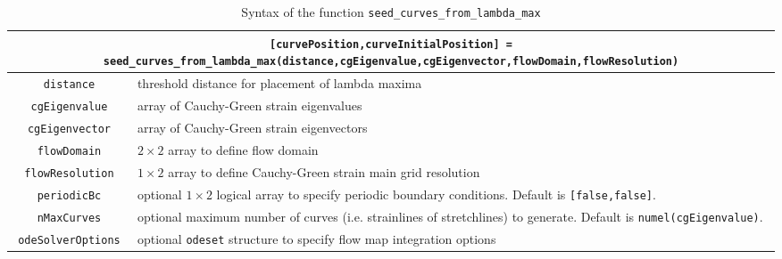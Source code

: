 \documentclass{article}
\begin{document}
\begin{table}
\begin{center}
\begin{tabular}{|c|p{}|}
\hline \hline
\multicolumn{2}{|p{\textwidth}|}{\lstinline![curvePosition,curveInitialPosition] = seed_curves_from_lambda_max(distance,cgEigenvalue,cgEigenvector,flowDomain,flowResolution)!}\\
\hline
\lstinline!distance! & threshold distance for placement of lambda maxima\\
\hline
\lstinline!cgEigenvalue! & array of Cauchy-Green strain eigenvalues\\
\hline
\lstinline!cgEigenvector! & array of Cauchy-Green strain eigenvectors\\
\hline
\lstinline!flowDomain! & $2 \times 2$ array to define flow domain\\
\hline
\lstinline!flowResolution! & $1 \times 2$ array to define Cauchy-Green strain main grid resolution\\
\hline
\lstinline!periodicBc! & optional $1 \times 2$ logical array to specify periodic boundary conditions. Default is \lstinline![false,false]!.\\
\hline
\lstinline!nMaxCurves! & optional maximum number of curves (i.e. strainlines of stretchlines) to generate. Default is \lstinline!numel(cgEigenvalue)!.\\
\hline
\lstinline!odeSolverOptions! & optional \lstinline!odeset! structure to specify flow map integration options\\
\hline \hline
\end{tabular}
\end{center}
\caption{Syntax of the function \lstinline!seed_curves_from_lambda_max!}
\label{t:seed_curves_from_lambda_max syntax}
\end{table}
\end{document}
